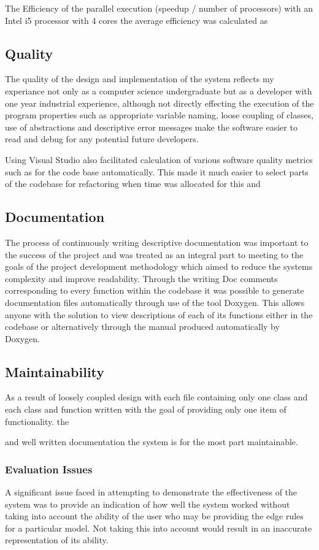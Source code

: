 The Efficiency of the parallel execution (speedup / number of processors) with an Intel i5 processor with 4 cores the average efficiency  was calculated as

\subsection{Quality}
The quality of the design and implementation of the system reflects my experiance not only as a computer science undergraduate but as a developer with one year industrial experience, although not directly effecting the execution of the program properties such as appropriate variable naming, loose coupling of classes, use of abstractions and descriptive error messages make the software easier to read and debug for any potential future developers. 

Using Visual Studio also facilitated calculation of various software quality metrics such as  for the code base automatically. This made it much easier to select parts of the codebase for refactoring when time was allocated for this and 

\subsection{Documentation}
The process of continuously writing descriptive documentation was important to the success of the project and was treated as an integral part to meeting to the goals of the project development methodology which aimed to reduce the systems complexity and improve readability. Through the writing Doc comments corresponding to every function within the codebase it was possible to generate documentation files automatically through use of the tool Doxygen. This allows anyone with the solution to view descriptions of each of its functions either in the codebase or alternatively through the manual produced automatically by Doxygen.

\subsection{Maintainability}
As a result of loosely coupled design with each file containing only one class and each class and function written with the goal of providing only one item of functionality. the 

and well written documentation the system is for the most part maintainable. 


\subsubsection{Evaluation Issues}
A significant issue faced in attempting to demonstrate the effectiveness of the system was to provide an indication of how well the system worked without taking into account the ability of the user who may be providing the edge rules for a particular model. Not taking this into account would result in an inaccurate representation of its ability.

